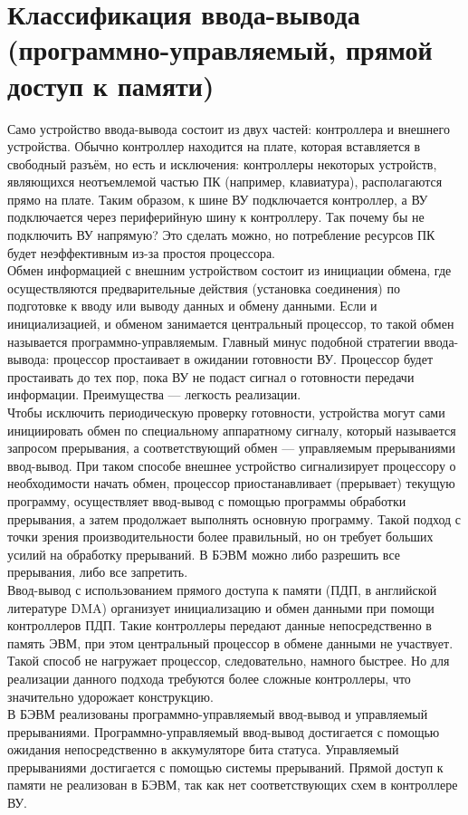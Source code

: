 


\section{Классификация ввода-вывода (программно-управляемый, прямой доступ к памяти)}
Само устройство ввода-вывода состоит из двух частей: контроллера и внешнего устройства. Обычно контроллер находится на плате, которая вставляется в свободный разъём, но есть и исключения: контроллеры некоторых устройств, являющихся неотъемлемой частью ПК (например, клавиатура), располагаются прямо на плате. Таким образом, к шине ВУ подключается контроллер, а ВУ подключается через периферийную шину к контроллеру. Так почему бы не подключить ВУ напрямую? Это сделать можно, но потребление ресурсов ПК будет неэффективным из-за простоя процессора.  \\
Обмен информацией с внешним устройством состоит из инициации обмена, где осуществляются предварительные действия (установка соединения) по подготовке к вводу или выводу данных и обмену данными. Если и инициализацией, и обменом занимается центральный процессор, то такой обмен называется программно-управляемым. Главный минус подобной стратегии ввода-вывода: процессор простаивает в ожидании готовности ВУ. Процессор будет простаивать до тех пор, пока ВУ не подаст сигнал о готовности передачи информации. Преимущества — легкость реализации.  \\
Чтобы исключить периодическую проверку готовности, устройства могут сами инициировать обмен по специальному аппаратному сигналу, который называется запросом прерывания, а соответствующий обмен — управляемым прерываниями ввод-вывод. При таком способе внешнее устройство сигнализирует процессору о необходимости начать обмен, процессор приостанавливает (прерывает) текущую программу, осуществляет ввод-вывод с помощью программы обработки прерывания, а затем продолжает выполнять основную программу. Такой подход с точки зрения производительности более правильный, но он требует больших усилий на обработку прерываний. В БЭВМ можно либо разрешить все прерывания, либо все запретить. \\
Ввод-вывод с использованием прямого доступа к памяти (ПДП, в английской литературе DMA) организует инициализацию и обмен данными при помощи контроллеров ПДП. Такие контроллеры передают данные непосредственно в память ЭВМ, при этом центральный процессор в обмене данными не участвует. Такой способ не нагружает процессор, следовательно, намного быстрее. Но для реализации данного подхода требуются более сложные контроллеры, что значительно удорожает конструкцию. \\
В БЭВМ реализованы программно-управляемый ввод-вывод и управляемый прерываниями. Программно-управляемый ввод-вывод достигается с помощью ожидания непосредственно в аккумуляторе бита статуса. Управляемый прерываниями достигается с помощью системы прерываний. Прямой доступ к памяти не реализован в БЭВМ, так как нет соответствующих схем в контроллере ВУ. \\

